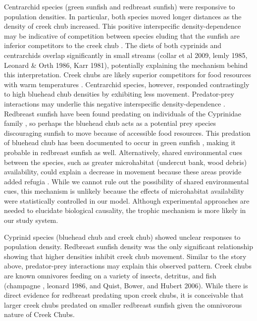 \documentclass[11pt, class=article, crop=false]{standalone}
\begin{document}
Centrarchid species (green sunfish and redbreast sunfish) were responsive to population densities. In particular, both species moved longer distances as the density of creek chub increased. This positive interspecific density-dependence may be indicative of competition between species eluding that the sunfish are inferior competitors to the creek chub \citep{jacobHabitatChoiceMeets2018}. The diets of both cyprinids and centrarchids overlap significantly in small streams (collar et al 2009, lemly 1985, Leonard & Orth 1986, Karr 1981), potentially explaining the mechanism behind this interpretation. Creek chubs are likely superior competitors for food resources with warm temperatures \cite{tangiguchiTemperatureMediationCompetitive1998}. Centrarchid species, however, responded contrastingly to high bluehead chub densities by exhibiting less movement. Predator-prey interactions may underlie this negative interspecific density-dependence \citep{jacobHabitatMatchingSpatial2015}. Redbreast sunfish have been found predating on individuals of the Cyprinidae family \citep{borrelliPuttingLakeTogether2023}, so perhaps the bluehead chub acts as a potential prey species discouraging sunfish to move because of accessible food resources. This predation of bluehead chub has been documented to occur in green sunfish \citep{lemlySuppressionNativeFish1985}, making it probable in redbreast sunfish as well. Alternatively, shared environmental cues between the species, such as greater microhabitat (undercut bank, wood debris) availability, could explain a decrease in movement because these areas provide added refugia \citep{careyEffectsLittoralHabitat2010}. While we cannot rule out the possibility of shared environmental cues, this mechanism is unlikely because the effects of microhabitat availability were statistically controlled in our model. Although experimental approaches are needed to elucidate biological causality, the trophic mechanism is more likely in our study system. 

Cyprinid species (bluehead chub and creek chub) showed unclear responses to population density. Redbreast sunfish density was the only significant relationship showing that higher densities inhibit creek chub movement. Similar to the story above, predator-prey interactions may explain this observed pattern. Creek chubs are known omnivores feeding on a variety of insects, detritus, and fish \citep{}(champagne , leonard 1986, and Quist, Bower, and Hubert 2006). While there is direct evidence for redbreast predating upon creek chubs, it is conceivable that larger creek chubs predated on smaller redbreast sunfish given the omnivorous nature of Creek Chubs.
\end{document}

